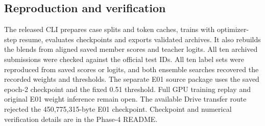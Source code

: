 \subsection{Reproduction and verification}

The released CLI prepares case splits and token caches, trains with
optimizer-step resume, evaluates checkpoints and exports validated
archives. It also rebuilds the blends from aligned saved member scores
and teacher logits. All ten archived submissions were checked against the
official test IDs. All ten label sets were reproduced from saved scores or
logits, and both ensemble searches recovered the recorded weights and
thresholds. The separate E01 source package uses the saved epoch-2
checkpoint and the fixed 0.51 threshold. Full GPU training replay and
original E01 weight inference remain open. The available Drive transfer
route rejected the 450,775,315-byte E01 checkpoint. Checkpoint and
numerical verification details are in the Phase-4 README.
